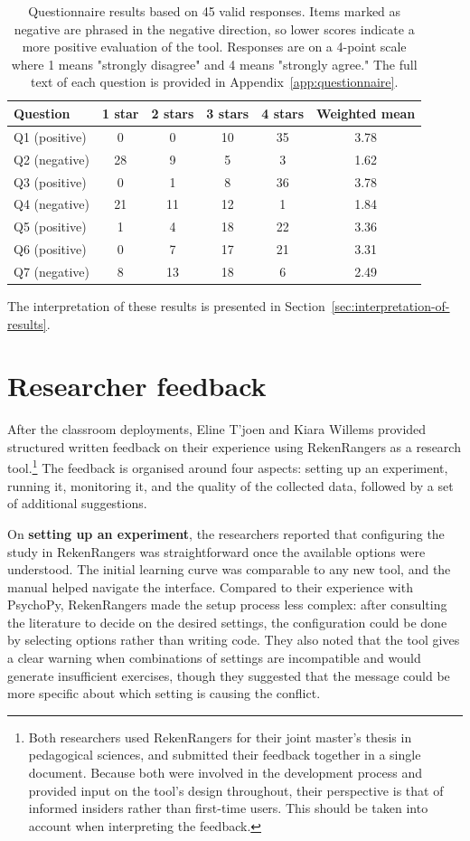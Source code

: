 \begin{table}
\centering
\begin{tabular}{lccccc}
\toprule
Question & 1 star & 2 stars & 3 stars & 4 stars & Weighted mean \\
\midrule
Q1 (positive) & 0 & 0 & 10 & 35 & 3.78 \\
Q2 (negative) & 28 & 9 & 5 & 3 & 1.62 \\
Q3 (positive) & 0 & 1 & 8 & 36 & 3.78 \\
Q4 (negative) & 21 & 11 & 12 & 1 & 1.84 \\
Q5 (positive) & 1 & 4 & 18 & 22 & 3.36 \\
Q6 (positive) & 0 & 7 & 17 & 21 & 3.31 \\
Q7 (negative) & 8 & 13 & 18 & 6 & 2.49 \\
\bottomrule
\end{tabular}
\caption{Questionnaire results based on 45 valid responses. Items marked as negative are phrased in the negative direction, so lower scores indicate a more positive evaluation of the tool. Responses are on a 4-point scale where 1 means "strongly disagree" and 4 means "strongly agree." The full text of each question is provided in Appendix~\ref{app:questionnaire}.}
\label{tab:questionnaire-results}
\end{table}
The interpretation of these results is presented in Section~\ref{sec:interpretation-of-results}.

\section{Researcher feedback}
After the classroom deployments, Eline T'joen and Kiara Willems provided structured written feedback on their experience using RekenRangers as a research tool.\footnote{Both researchers used RekenRangers for their joint master's thesis in pedagogical sciences, and submitted their feedback together in a single document. Because both were involved in the development process and provided input on the tool's design throughout, their perspective is that of informed insiders rather than first-time users. This should be taken into account when interpreting the feedback.} The feedback is organised around four aspects: setting up an experiment, running it, monitoring it, and the quality of the collected data, followed by a set of additional suggestions.

On \textbf{setting up an experiment}, the researchers reported that configuring the study in RekenRangers was straightforward once the available options were understood. The initial learning curve was comparable to any new tool, and the manual helped navigate the interface. Compared to their experience with PsychoPy, RekenRangers made the setup process less complex: after consulting the literature to decide on the desired settings, the configuration could be done by selecting options rather than writing code. They also noted that the tool gives a clear warning when combinations of settings are incompatible and would generate insufficient exercises, though they suggested that the message could be more specific about which setting is causing the conflict.


